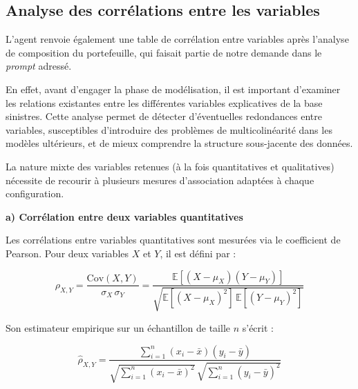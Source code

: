 \subsection{Analyse des corrélations entre les variables}

L'agent renvoie également une table de corrélation entre variables après l'analyse de composition du portefeuille, qui faisait partie de notre demande dans le \textit{prompt} adressé.

En effet, avant d'engager la phase de modélisation, il est important d'examiner les relations existantes entre les différentes variables explicatives de la base sinistres. Cette analyse permet de détecter d'éventuelles redondances entre variables, susceptibles d'introduire des problèmes de multicolinéarité dans les modèles ultérieurs, et de mieux comprendre la structure sous-jacente des données.

La nature mixte des variables retenues (à la fois quantitatives et qualitatives) nécessite de recourir à plusieurs mesures d'association adaptées à chaque configuration.


\vspace{2ex}
\noindent\hspace{1.5em}\textbf{a) Corrélation entre deux variables quantitatives}
\vspace{1ex}

Les corrélations entre variables quantitatives sont mesurées via le coefficient de Pearson. Pour deux variables $X$ et $Y$, il est défini par :

\begin{equation}
    \rho_{X,Y} = \frac{\text{Cov}(X, Y)}{\sigma_X \, \sigma_Y} = \frac{\mathbb{E}\left[(X - \mu_X)(Y - \mu_Y)\right]}{\sqrt{\mathbb{E}[(X - \mu_X)^2] \, \mathbb{E}[(Y - \mu_Y)^2]}}
\end{equation}

Son estimateur empirique sur un échantillon de taille $n$ s'écrit :

\begin{equation}
    \hat{\rho}_{X,Y} = \frac{\sum_{i=1}^{n} (x_i - \bar{x})(y_i - \bar{y})}{\sqrt{\sum_{i=1}^{n} (x_i - \bar{x})^2} \, \sqrt{\sum_{i=1}^{n} (y_i - \bar{y})^2}}
\end{equation}

